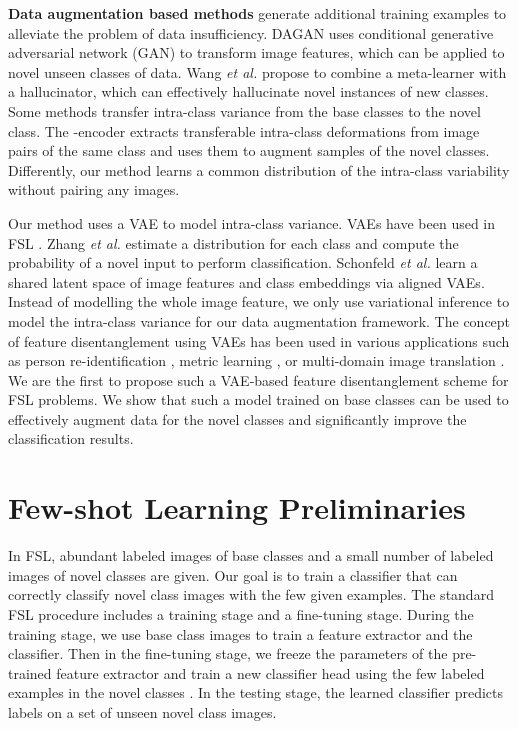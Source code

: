 \documentclass[10pt,twocolumn,letterpaper]{article}
\begin{document}
      \textbf{Data augmentation based methods} \cite{dagan,delta-encoder,wang2018lowshot} generate additional training examples to alleviate the problem of data insufficiency. 
DAGAN \cite{dagan} uses conditional generative adversarial network (GAN) to transform image features, which can be applied to novel unseen classes of data.
Wang \textit{et al.} \cite{wang2018lowshot} propose to combine a meta-learner with a hallucinator, which can effectively hallucinate novel instances of new classes. Some methods transfer intra-class variance from the base classes to the novel class. The -encoder \cite{delta-encoder} extracts transferable intra-class deformations from image pairs of the same class and uses them to augment samples of the novel classes.
      Differently, our method learns a common distribution of the intra-class variability without pairing any images.


Our method uses a VAE to model intra-class variance. VAEs have been used in FSL \cite{variational_fewshot,aligned_vae,proto_vae}.
Zhang \textit{et al.}  \cite{variational_fewshot} estimate a distribution for each class and compute the probability of a
     novel input to perform classification.
Schonfeld \textit{et al.} \cite{aligned_vae} learn a shared latent space of image features and class embeddings via aligned VAEs.
     Instead of modelling the whole image feature, we only use variational inference to model the intra-class variance for our data augmentation framework. The concept of feature disentanglement using VAEs has been used in various applications such as person re-identification \cite{reid2019chanho,Zou2020JointDA}, metric learning \cite{metric_learning}, or multi-domain image translation \cite{unified2018liu,diverse2018lee}.
     We are the first to propose such a VAE-based feature disentanglement scheme for FSL problems. We show that such a model trained on base classes can be used to effectively augment data for the novel classes and significantly improve the classification results.  


\section{Few-shot Learning Preliminaries}
In FSL, abundant labeled images of base classes and a small number of labeled images of novel classes are given.
Our goal is to train a classifier that can correctly classify novel class images with the few given examples.
The standard FSL procedure   includes a training stage and a fine-tuning stage.
During the training stage, we use base class images to train a feature extractor and the classifier.
Then in the fine-tuning stage, we freeze the parameters of the pre-trained feature extractor and train a new classifier head using the few labeled  examples in the novel classes . 
In the testing stage, the learned classifier predicts labels on a set of unseen novel class images.
  
\end{document}
